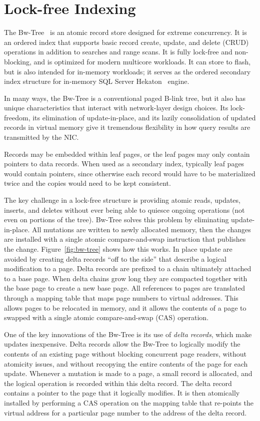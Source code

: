\section{Lock-free Indexing}
\label{sec:bwtree-intro}
The Bw-Tree~\cite{bw-tree} is an atomic record store designed for extreme
concurrency. It is an ordered index that supports basic record create, update,
and delete (CRUD) operations in addition to searches and range scans.  It is
fully lock-free and non-blocking, and is optimized for modern multicore
workloads. It can store to flash, but is also intended for in-memory
workloads; it serves as the ordered secondary index structure for in-memory SQL
Server Hekaton~\cite{hekaton} engine.

In many ways, the Bw-Tree is a conventional paged B-link tree,
but it also has unique characteristics that interact with network-layer
design choices. Its lock-freedom, its elimination of update-in-place,
and its lazily consolidation of updated records in virtual memory give it
tremendous flexibility in how query results are transmitted by the NIC.

Records may be embedded within leaf pages, or the leaf pages may
only contain pointers to data records. When used as a secondary index,
typically leaf pages would contain pointers, since otherwise each record would
have to be materialized twice and the copies would need to be kept consistent.


The key challenge in a lock-free structure is providing atomic reads, updates,
inserts, and deletes without ever being able to quiesce ongoing operations (not
even on portions of the tree). Bw-Tree solves this problem by eliminating
update-in-place. All mutations are written to newly allocated memory, then
the changes are installed with a single atomic compare-and-swap instruction
that publishes the change.  Figure~\ref{fig:bw-tree} shows how this works.
In place update are avoided by creating delta records ``off to the side'' 
that describe a logical modification to a page. Delta records are
prefixed to a chain ultimately attached to a base page.  When delta chains
grow long they are compacted together with the base page to create a new base page.
All references to pages are translated through a mapping table that maps page
numbers to virtual addresses. This allows pages to be relocated in memory, and
it allows the contents of a page to swapped with a single atomic
compare-and-swap (CAS) operation.

One of the key innovations of the Bw-Tree is its use of {\em delta records},
which make updates inexpensive.
Delta records allow the Bw-Tree to logically modify the
contents of an existing page without blocking concurrent page readers, without
atomicity issues, and without recopying the entire contents of the page for
each update.  Whenever a mutation is made to a page, a small record is
allocated, and the logical operation is recorded within this delta record. The delta
record contains a pointer to the page that it logically modifies. It
is then atomically installed by performing a CAS operation on the
mapping table that re-points the virtual address for a particular page number
to the address of the delta record.


